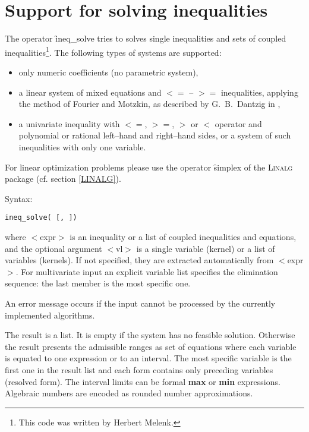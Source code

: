 \section{Support for solving inequalities}
\hypertarget{operator:INEQ_SOLVE}{}
The operator \f{ineq\_solve}
tries to solves single inequalities and sets of coupled inequalities\footnote{This code was written by Herbert Melenk.}.
The following types of systems are supported:
\begin{itemize}
\item only numeric coefficients (no parametric system),
\item a linear system of mixed equations and $<=$ -- $>=$ 
     inequalities, applying the method of Fourier and Motzkin, as described by G.~B.~Dantzig in \cite{Dantzig1963},
\item a univariate inequality with $<=$, $>=$, $>$ or $<$ operator
     and polynomial or rational left--hand and right--hand sides,
     or a system of such inequalities with only one variable.
\end{itemize}
For linear optimization problems please use the operator
\f{simplex} of the \textsc{Linalg} package (cf. section \ref{LINALG}).

Syntax:
\begin{syntax}
  \texttt{ineq\_solve( [,\,])}
\end{syntax}
where $<$expr$>$ is an inequality or a list of coupled inequalities
and equations, and the optional argument $<$vl$>$ is a single
variable (kernel) or a list of variables (kernels). If not
specified, they are extracted automatically from $<$expr$>$.
For multivariate input an explicit variable list specifies the
elimination sequence: the last member is the most specific one.

An error message occurs if the input cannot be processed by the
currently implemented algorithms.

The result is a list. It is empty if the system has no feasible solution.
Otherwise the result presents the admissible ranges as set
of equations where each variable is equated to 
one expression or to an interval. 
The most specific variable is the first one in the result list and
each form contains only preceding variables (resolved form).
The interval limits can be formal \textbf{max} or \textbf{min} expressions.
Algebraic numbers are encoded as rounded number approximations.

